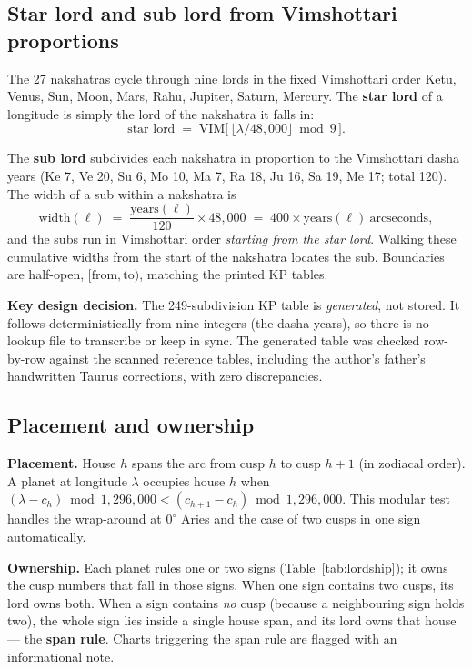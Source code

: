 \documentclass[11pt, a4paper]{article}
\begin{document}
\subsection{Star lord and sub lord from Vimshottari proportions}

The 27 nakshatras cycle through nine lords in the fixed Vimshottari order
Ketu, Venus, Sun, Moon, Mars, Rahu, Jupiter, Saturn, Mercury. The
\textbf{star lord} of a longitude is simply the lord of the nakshatra it falls
in:
\[
  \text{star lord} \;=\; \text{VIM}\big[\,\lfloor \lambda / 48{,}000 \rfloor \bmod 9\,\big].
\]

The \textbf{sub lord} subdivides each nakshatra in proportion to the
Vimshottari dasha years (Ke 7, Ve 20, Su 6, Mo 10, Ma 7, Ra 18, Ju 16, Sa 19,
Me 17; total 120). The width of a sub within a nakshatra is
\[
  \text{width}(\ell) \;=\; \frac{\text{years}(\ell)}{120}\times 48{,}000
  \;=\; 400 \times \text{years}(\ell)\ \text{arcseconds},
\]
and the subs run in Vimshottari order \emph{starting from the star lord}.
Walking these cumulative widths from the start of the nakshatra locates the
sub. Boundaries are half-open, $[\text{from}, \text{to})$, matching the printed
KP tables.

\begin{notebox}
\textbf{Key design decision.} The 249-subdivision KP table is \emph{generated},
not stored. It follows deterministically from nine integers (the dasha years),
so there is no lookup file to transcribe or keep in sync. The generated table
was checked row-by-row against the scanned reference tables, including the
author's father's handwritten Taurus corrections, with zero discrepancies.
\end{notebox}

\subsection{Placement and ownership}

\textbf{Placement.} House $h$ spans the arc from cusp $h$ to cusp $h{+}1$
(in zodiacal order). A planet at longitude $\lambda$ occupies house $h$ when
$(\lambda - c_h) \bmod 1{,}296{,}000 < (c_{h+1} - c_h) \bmod 1{,}296{,}000$.
This modular test handles the wrap-around at $0^\circ$ Aries and the case of
two cusps in one sign automatically.

\textbf{Ownership.} Each planet rules one or two signs
(Table~\ref{tab:lordship}); it owns the cusp numbers that fall in those signs.
When one sign contains two cusps, its lord owns both. When a sign contains
\emph{no} cusp (because a neighbouring sign holds two), the whole sign lies
inside a single house span, and its lord owns that house --- the
\textbf{span rule}. Charts triggering the span rule are flagged with an
informational note.
\end{document}
